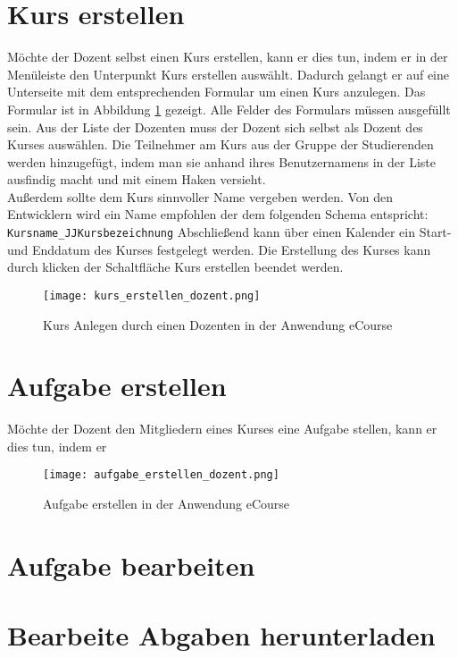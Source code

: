 \section{Kurs erstellen}
Möchte der Dozent selbst einen Kurs erstellen, kann er dies tun, indem er in der Menüleiste den Unterpunkt \glqq Kurs erstellen\grqq\; auswählt. Dadurch gelangt er auf eine Unterseite mit dem entsprechenden Formular um einen Kurs anzulegen. Das Formular ist in Abbildung \ref{fib:kurs_anlegen} gezeigt. Alle Felder des Formulars müssen ausgefüllt sein. Aus der Liste der Dozenten muss der Dozent sich selbst als Dozent des Kurses auswählen.
Die Teilnehmer am Kurs aus der Gruppe der Studierenden werden hinzugefügt, indem man sie anhand ihres Benutzernamens in der Liste ausfindig macht und mit einem Haken versieht. \\
Außerdem sollte dem Kurs sinnvoller Name vergeben werden. Von den Entwicklern wird ein Name empfohlen der dem folgenden Schema entspricht: \\
\verb/Kursname_JJKursbezeichnung/
Abschließend kann über einen Kalender ein Start- und Enddatum des Kurses festgelegt werden. 
Die Erstellung des Kurses kann durch klicken der Schaltfläche \glqq Kurs erstellen\grqq\: beendet werden.

\begin{figure}[h]
\centering
\texttt{[image: kurs\_erstellen\_dozent.png]}
\caption{Kurs Anlegen durch einen Dozenten in der Anwendung eCourse}
\label{fib:kurs_anlegen}
\end{figure}

\section{Aufgabe erstellen}
Möchte der Dozent den Mitgliedern eines Kurses eine Aufgabe stellen, kann er dies tun, indem er 

\begin{figure}[h]
\centering
\texttt{[image: aufgabe\_erstellen\_dozent.png]}
\caption{Aufgabe erstellen in der Anwendung eCourse}
\label{fib:aufgabe_anlegen}
\end{figure}


\section{Aufgabe bearbeiten}
\label{sec:bearbeiten}

\section{Bearbeite Abgaben herunterladen}
\label{sec:herunterladen}